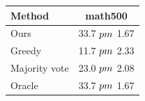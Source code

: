 \begin{tabular}{lc}
\toprule
Method & math500 \\
\midrule
Ours & 33.7 $\\pm$ 1.67 \\
Greedy & 11.7 $\\pm$ 2.33 \\
Majority vote & 23.0 $\\pm$ 2.08 \\
Oracle & 33.7 $\\pm$ 1.67 \\
\bottomrule
\end{tabular}
